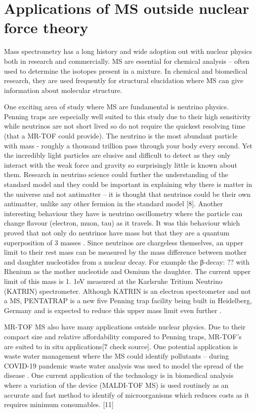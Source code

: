 \section{Applications of MS outside nuclear force theory}

Mass spectrometry has a long history and wide adoption out with nuclear physics both in research and commercially.
MS are essential for chemical analysis – often used to determine the isotopes present in a mixture.
In chemical and biomedical research, they are used frequently for structural elucidation where MS can give information about molecular structure. \cite{bhattarai_chapter_2020}

One exciting area of study where MS are fundamental is neutrino physics.
Penning traps are especially well suited to this study due to their high sensitivity while neutrinos are not short lived so do not require the quickest resolving time (that a MR-TOF could provide).
The neutrino is the most abundant particle with mass - roughly a thousand trillion pass through your body every second. \cite{noauthor_whats_nodate}
Yet the incredibly light particles are elusive and difficult to detect as they only interact with the weak force and gravity so surprisingly little is known about them. \cite{noauthor_what_nodate}
Research in neutrino science could further the understanding of the standard model and they could be important in explaining why there is matter in the universe and not antimatter \cite{gibney_morphing_2015} – it is thought that neutrinos could be their own antimatter, unlike any other fermion in the standard model [8].
Another interesting behaviour they have is neutrino oscillometry where the particle can change flavour (electron, muon, tau) as it travels.
It was this behaviour which proved that not only do neutrinos have mass but that they are a quantum superposition of 3 masses \cite{gibney_morphing_2015}.
Since neutrinos are chargeless themselves, an upper limit to their rest mass can be measured by the mass difference between mother and daughter nucleotides from a nuclear decay. \cite{eliseev_penning-trap_2013}
For example the β-decay: $??$ with Rhenium as the mother nucleotide and Osmium the daughter. \cite{repp_pentatrap_2012}
The current upper limit of this mass is 1.
1eV measured at the Karlsruhe Tritium Neutrino (KATRIN) spectrometer. \cite{castelvecchi_physicists_2019}
Although KATRIN is an electron spectrometer and not a MS, PENTATRAP is a new five Penning trap facility being built in Heidelberg, Germany and is expected to reduce this upper mass limit even further \cite{repp_pentatrap_2012}.

MR-TOF MS also have many applications outside nuclear physics.
Due to their compact size and relative affordability compared to Penning traps, MR-TOF's are suited to in situ applications[7 check source].
One potential application is waste water management where the MS could identify pollutants \cite{dickel_multiple-reflection_2013} – during COVID-19 pandemic waste water analysis was used to model the spread of the disease \cite{noauthor_wastewater_nodate}.
One current application of the technology is in biomedical analysis where a variation of the device (MALDI-TOF MS) is used routinely as an accurate and fast method to identify of microorganisms which reduces costs as it requires minimum consumables. [11]
